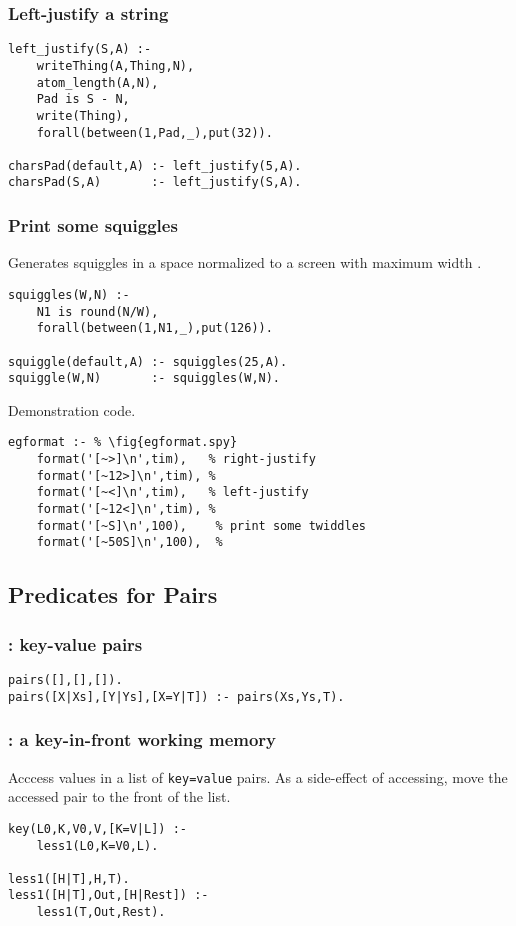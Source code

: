 \subsubsection{ Left-justify a string }\begin{Verbatim}
left_justify(S,A) :-
    writeThing(A,Thing,N),
    atom_length(A,N),
    Pad is S - N,
    write(Thing),
    forall(between(1,Pad,_),put(32)).

charsPad(default,A) :- left_justify(5,A).
charsPad(S,A)       :- left_justify(S,A).
\end{Verbatim}
\subsubsection{ Print some squiggles
}
Generates  squiggles in a space normalized 
to a screen with maximum width . 
\begin{Verbatim}
squiggles(W,N) :-
    N1 is round(N/W),
    forall(between(1,N1,_),put(126)).

squiggle(default,A) :- squiggles(25,A).
squiggle(W,N)       :- squiggles(W,N).
\end{Verbatim} 
Demonstration code.
\begin{Verbatim}
egformat :- % \fig{egformat.spy}
    format('[~>]\n',tim),   % right-justify
    format('[~12>]\n',tim), %  
    format('[~<]\n',tim),   % left-justify
    format('[~12<]\n',tim), %  
    format('[~S]\n',100),    % print some twiddles
    format('[~50S]\n',100),  %  
\end{Verbatim}

\subsection{ Predicates for Pairs
}
\subsubsection{ : key-value pairs }\begin{Verbatim}
pairs([],[],[]).
pairs([X|Xs],[Y|Ys],[X=Y|T]) :- pairs(Xs,Ys,T).
\end{Verbatim}
\subsubsection{ : a key-in-front working memory
}
Acccess values in a list of {\tt key=value}
pairs. As a side-effect of accessing, move the
accessed pair to the front of the list.
\begin{Verbatim}
key(L0,K,V0,V,[K=V|L]) :- 
    less1(L0,K=V0,L).

less1([H|T],H,T).
less1([H|T],Out,[H|Rest]) :- 
    less1(T,Out,Rest).
\end{Verbatim}
